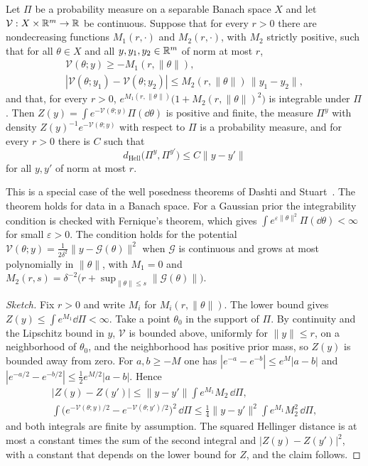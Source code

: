 \begin{theorem}[Stuart]
\label{thm:stuart_wellposed}
Let $\Pi$ be a probability measure on a separable Banach space $X$ and let $\mathcal{V}:X\times\mathbb{R}^m\to\mathbb{R}$ be continuous. Suppose that for every $r>0$ there are nondecreasing functions $M_1(r,\cdot)$ and $M_2(r,\cdot)$, with $M_2$ strictly positive, such that for all $\theta\in X$ and all $y,y_1,y_2\in\mathbb{R}^m$ of norm at most $r$,
\[
\begin{gathered}
\mathcal{V}(\theta;y)\geq-M_1(r,\|\theta\|),\\
|\mathcal{V}(\theta;y_1)-\mathcal{V}(\theta;y_2)|\leq M_2(r,\|\theta\|)\,\|y_1-y_2\|,
\end{gathered}
\]
and that, for every $r>0$, $e^{M_1(r,\|\theta\|)}\big(1+M_2(r,\|\theta\|)^2\big)$ is integrable under $\Pi$. Then $Z(y) = \int e^{-\mathcal{V}(\theta;y)}\Pi(\dd\theta)$ is positive and finite, the measure $\Pi^y$ with density $Z(y)^{-1}e^{-\mathcal{V}(\theta;y)}$ with respect to $\Pi$ is a probability measure, and for every $r>0$ there is $C$ such that
\[
d_{\mathrm{Hell}}\big(\Pi^y,\Pi^{y'}\big)\leq C\|y-y'\|
\]
for all $y,y'$ of norm at most $r$.
\end{theorem}

This is a special case of the well posedness theorems of Dashti and Stuart~\cite{dashti2017}. The theorem holds for data in a Banach space. For a Gaussian prior the integrability condition is checked with Fernique's theorem, which gives $\int e^{\varepsilon\|\theta\|^2}\Pi(\dd\theta)<\infty$ for small $\varepsilon>0$. The condition holds for the potential $\mathcal{V}(\theta;y) = \frac{1}{2\delta^2}\|y-\mathcal{G}(\theta)\|^2$ when $\mathcal{G}$ is continuous and grows at most polynomially in $\|\theta\|$, with $M_1 = 0$ and $M_2(r,s) = \delta^{-2}\big(r+\sup_{\|\theta\|\leq s}\|\mathcal{G}(\theta)\|\big)$.

\begin{proof}[Sketch]
Fix $r>0$ and write $M_i$ for $M_i(r,\|\theta\|)$. The lower bound gives $Z(y)\leq\int e^{M_1}\dd\Pi<\infty$. Take a point $\theta_0$ in the support of $\Pi$. By continuity and the Lipschitz bound in $y$, $\mathcal{V}$ is bounded above, uniformly for $\|y\|\leq r$, on a neighborhood of $\theta_0$, and the neighborhood has positive prior mass, so $Z(y)$ is bounded away from zero. For $a,b\geq-M$ one has $|e^{-a}-e^{-b}|\leq e^M|a-b|$ and $|e^{-a/2}-e^{-b/2}|\leq\frac12e^{M/2}|a-b|$. Hence
\[
\begin{gathered}
|Z(y)-Z(y')|\leq\|y-y'\|\int e^{M_1}M_2\,\dd\Pi,\\
\int\big(e^{-\mathcal{V}(\theta;y)/2}-e^{-\mathcal{V}(\theta;y')/2}\big)^2\,\dd\Pi\leq\frac14\|y-y'\|^2\int e^{M_1}M_2^2\,\dd\Pi,
\end{gathered}
\]
and both integrals are finite by assumption. The squared Hellinger distance is at most a constant times the sum of the second integral and $|Z(y)-Z(y')|^2$, with a constant that depends on the lower bound for $Z$, and the claim follows.
\end{proof}

